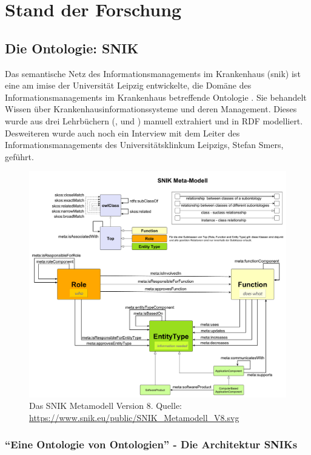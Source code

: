 \chapter{Stand der Forschung}\label{ch:relatedWork}

\section{Die Ontologie: SNIK}

Das semantische Netz des Informationsmanagements im Krankenhaus (\ac{snik}) ist eine am \ac{imise} der Universität Leipzig entwickelte,
die Domäne des Informationsmanagements im Krankenhaus betreffende Ontologie \citep{domaene}.
Sie behandelt Wissen über Krankenhausinformationssysteme und deren Management.
Dieses wurde aus drei Lehrbüchern (\citet{bb}, \citet{ob} und \citet{he}) manuell extrahiert und in RDF modelliert.
Desweiteren wurde auch noch ein Interview mit dem Leiter des Informationsmanagements des Universitätsklinkum Leipzigs, Stefan Smers, geführt.

\begin{figure}
\centering
\includegraphics[width=.8\textwidth, height=.9\textheight, keepaspectratio]{Images/snik-metamodel.pdf}
\caption[SNIK Metamodell Version 8]{Das SNIK Metamodell Version 8. Quelle: \url{https://www.snik.eu/public/SNIK_Metamodell_V8.svg}}
\label{fig:snik-metamodel}
\end{figure}

\subsection{\enquote{Eine Ontologie von Ontologien} - Die Architektur SNIKs}

